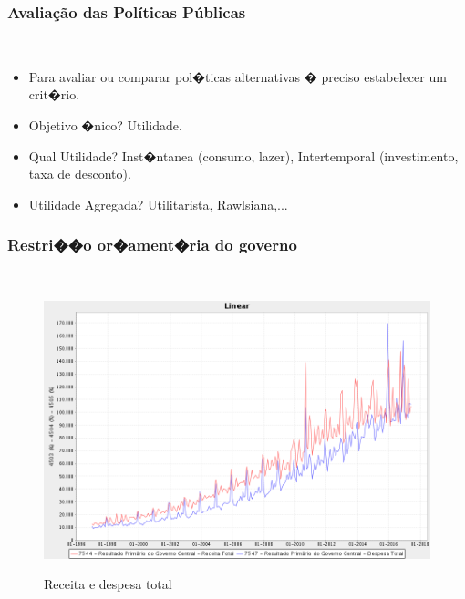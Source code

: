 \documentclass[11pt, hide notes]{beamer} %
\begin{document}
\begin{frame}[label=myslide14] %
	
	\frametitle{Avaliação das Políticas Públicas} {\ %
		

\begin{itemize}	
	\pause \item Para avaliar ou comparar pol�ticas alternativas � preciso estabelecer um crit�rio. 
	\pause \item Objetivo �nico? Utilidade.
	\pause \item Qual Utilidade? Inst�ntanea (consumo, lazer),
	Intertemporal (investimento, taxa de desconto).
	\pause \item Utilidade Agregada? Utilitarista, Rawlsiana,...
\end{itemize}

}
\end{frame}

\begin{frame}[label=myslide4.1] %
	
	\frametitle{Restri��o or�ament�ria do governo} {\ %
		
		\begin{figure}
			\includegraphics[scale=0.3]{fig1.png}
			\label{fig1} 
			\caption{Receita e despesa total} 
		\end{figure}
		
	}  %
\end{frame}
\end{document}
